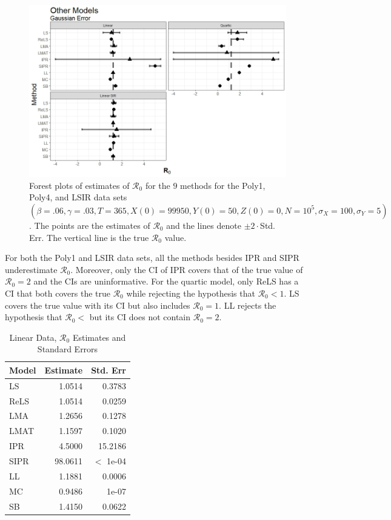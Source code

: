 \documentclass[12pt]{article}
\newcommand{\xxsir}{\ensuremath{9} } %
\newcommand{\rr}{\ensuremath{\mathcal{R}_0}}
\begin{document}
\begin{figure}[H]
  \begin{center}
    \includegraphics[scale=0.5]{images/other_n.jpeg}
  \caption{Forest plots of estimates of $\rr$ for the \xxsir methods for the Poly1, Poly4, and LSIR data sets $(\beta=.06, \gamma=.03, T=365, X(0)=99950, Y(0)=50, Z(0)=0, N=10^5, \sigma_X=100, \sigma_Y=5)$.  The points are the estimates of $\rr$ and the lines denote $\pm 2\cdot $Std. Err.  The vertical line is the true $\rr$ value.}
  \label{fig:other-res}	
  \end{center}
\end{figure}

For both the Poly1 and LSIR data sets, all the methods besides IPR and SIPR underestimate $\rr$.  Moreover, only the CI of IPR covers that of the true value of $\rr=2$ and the CIs are uninformative.  For the quartic model, only ReLS has a CI that both covers the true $\rr$ while rejecting the hypothesis that $\rr < 1$.  LS covers the true value with its CI but also includes $\rr=1$.  LL rejects the hypothesis that $\rr <$ but its CI does not contain $\rr=2$.

\begin{table}[H]

	\centering
	\begin{tabular}[t]{l|r|r}
		\hline
		Model & Estimate & Std. Err\\
		\hline
		LS & 1.0514 & 0.3783\\
		\hline
		ReLS & 1.0514 & 0.0259\\
		\hline
		LMA & 1.2656 & 0.1278\\
		\hline
		LMAT & 1.1597 & 0.1020\\
		\hline
		IPR & 4.5000 & 15.2186\\
		\hline
		SIPR & 98.0611 & $<$ 1e-04\\
		\hline
		LL & 1.1881 & 0.0006\\
		\hline
		MC & 0.9486 & 1e-07 \\
		\hline
		SB & 1.4150 & 0.0622\\
		\hline
	\end{tabular}
	\caption{Linear Data, $\rr$ Estimates and Standard Errors}\label{tab:other-res1}
\end{table}
\end{document}
